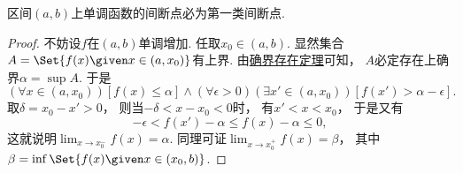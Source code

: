 \begin{example}\label{example:连续函数的运算.开区间上的单调函数的间断点必为第一类间断点}
区间\((a,b)\)上单调函数的间断点必为第一类间断点.
\begin{proof}
不妨设\(f\)在\((a,b)\)单调增加.
任取\(x_0\in(a,b)\).
显然集合\(A=\Set{ f(x) \given x\in(a,x_0) }\)有上界.
由\hyperref[theorem:实数.确界原理]{确界存在定理}可知，
\(A\)必定存在上确界\(\alpha=\sup A\).
于是\[
	(\forall x\in(a,x_0))
	[f(x)\leq\alpha]
	\land
	(\forall\epsilon>0)
	(\exists x'\in(a,x_0))
	[f(x')>\alpha-\epsilon].
\]
取\(\delta=x_0-x'>0\)，
则当\(-\delta<x-x_0<0\)时，
有\(x'<x<x_0\)，
于是又有\[
	-\epsilon
	< f(x') - \alpha
	\leq f(x) - \alpha
	\leq 0,
\]
这就说明\(\lim_{x \to x_0^-} f(x) = \alpha\).
同理可证\(\lim_{x \to x_0^+} f(x) = \beta\)，
其中\(\beta=\inf\Set{ f(x) \given x\in(x_0,b) }\).
\end{proof}
\end{example}

